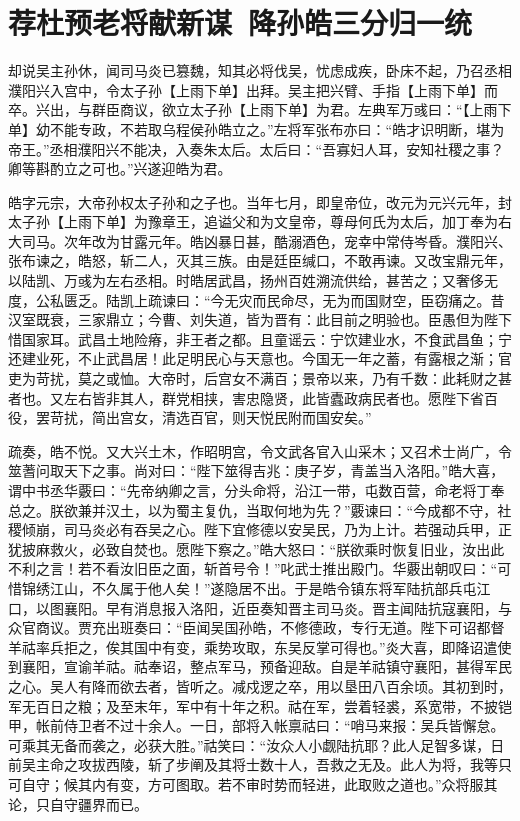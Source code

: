 \chapter{荐杜预老将献新谋~降孙皓三分归一统}

却说吴主孙休，闻司马炎已篡魏，知其必将伐吴，忧虑成疾，卧床不起，乃召丞相濮阳兴入宫中，令太子孙【上雨下单】出拜。吴主把兴臂、手指【上雨下单】而卒。兴出，与群臣商议，欲立太子孙【上雨下单】为君。左典军万彧曰：“【上雨下单】幼不能专政，不若取乌程侯孙皓立之。”左将军张布亦曰：“皓才识明断，堪为帝王。”丞相濮阳兴不能决，入奏朱太后。太后曰：“吾寡妇人耳，安知社稷之事？卿等斟酌立之可也。”兴遂迎皓为君。

皓字元宗，大帝孙权太子孙和之子也。当年七月，即皇帝位，改元为元兴元年，封太子孙【上雨下单】为豫章王，追谥父和为文皇帝，尊母何氏为太后，加丁奉为右大司马。次年改为甘露元年。皓凶暴日甚，酷溺酒色，宠幸中常侍岑昏。濮阳兴、张布谏之，皓怒，斩二人，灭其三族。由是廷臣缄口，不敢再谏。又改宝鼎元年，以陆凯、万彧为左右丞相。时皓居武昌，扬州百姓溯流供给，甚苦之；又奢侈无度，公私匮乏。陆凯上疏谏曰：“今无灾而民命尽，无为而国财空，臣窃痛之。昔汉室既衰，三家鼎立；今曹、刘失道，皆为晋有：此目前之明验也。臣愚但为陛下惜国家耳。武昌土地险瘠，非王者之都。且童谣云：宁饮建业水，不食武昌鱼；宁还建业死，不止武昌居！此足明民心与天意也。今国无一年之蓄，有露根之渐；官吏为苛扰，莫之或恤。大帝时，后宫女不满百；景帝以来，乃有千数：此耗财之甚者也。又左右皆非其人，群党相挟，害忠隐贤，此皆蠹政病民者也。愿陛下省百役，罢苛扰，简出宫女，清选百官，则天悦民附而国安矣。”

疏奏，皓不悦。又大兴土木，作昭明宫，令文武各官入山采木；又召术士尚广，令筮蓍问取天下之事。尚对曰：“陛下筮得吉兆：庚子岁，青盖当入洛阳。”皓大喜，谓中书丞华覈曰：“先帝纳卿之言，分头命将，沿江一带，屯数百营，命老将丁奉总之。朕欲兼并汉土，以为蜀主复仇，当取何地为先？”覈谏曰：“今成都不守，社稷倾崩，司马炎必有吞吴之心。陛下宜修德以安吴民，乃为上计。若强动兵甲，正犹披麻救火，必致自焚也。愿陛下察之。”皓大怒曰：“朕欲乘时恢复旧业，汝出此不利之言！若不看汝旧臣之面，斩首号令！”叱武士推出殿门。华覈出朝叹曰：“可惜锦绣江山，不久属于他人矣！”遂隐居不出。于是皓令镇东将军陆抗部兵屯江口，以图襄阳。早有消息报入洛阳，近臣奏知晋主司马炎。晋主闻陆抗寇襄阳，与众官商议。贾充出班奏曰：“臣闻吴国孙皓，不修德政，专行无道。陛下可诏都督羊祜率兵拒之，俟其国中有变，乘势攻取，东吴反掌可得也。”炎大喜，即降诏遣使到襄阳，宣谕羊祜。祜奉诏，整点军马，预备迎敌。自是羊祜镇守襄阳，甚得军民之心。吴人有降而欲去者，皆听之。减戍逻之卒，用以垦田八百余顷。其初到时，军无百日之粮；及至末年，军中有十年之积。祜在军，尝着轻裘，系宽带，不披铠甲，帐前侍卫者不过十余人。一日，部将入帐禀祜曰：“哨马来报：吴兵皆懈怠。可乘其无备而袭之，必获大胜。”祜笑曰：“汝众人小觑陆抗耶？此人足智多谋，日前吴主命之攻拔西陵，斩了步阐及其将士数十人，吾救之无及。此人为将，我等只可自守；候其内有变，方可图取。若不审时势而轻进，此取败之道也。”众将服其论，只自守疆界而已。

